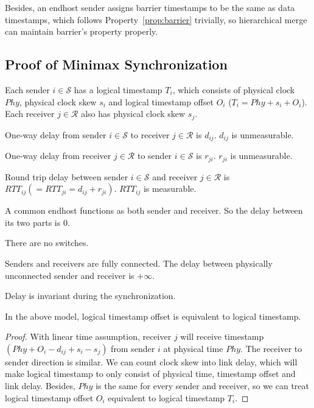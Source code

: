 Besides, an endhost sender assigns barrier timestamps to be the same as data timestamps, which follows Property~\ref{prop:barrier} trivially, so hierarchical merge can maintain barrier's property properly.
\subsection{Proof of Minimax Synchronization}
\label{appx:minimax}

\begin{notation}
	Each sender $i\in\mathcal{S}$ has a logical timestamp $T_i$, which consists of physical clock $Phy$, physical clock skew $s_i$ and logical timestamp offset $O_i$ ($T_i = Phy+s_i+O_i$). Each receiver $j \in \mathcal{R}$ also has physical clock skew $s_j$.
\end{notation}\begin{notation}
	One-way delay from sender $i \in \mathcal{S}$ to receiver $j \in \mathcal{R}$ is $d_{ij}$. $d_{ij}$ is unmeasurable.
\end{notation}
\begin{notation}
	One-way delay from receiver $j \in \mathcal{R}$ to sender $i \in \mathcal{S}$ is $r_{ji}$. $r_{ji}$ is unmeasurable.
\end{notation}
\begin{notation}
	Round trip delay between sender $i \in \mathcal{S}$ and receiver $j \in \mathcal{R}$ is $RTT_{ij}( = RTT_{ji} = d_{ij} + r_{ji})$. $RTT_{ij}$ is measurable.
\end{notation}
\begin{note}
	A common endhost functions as both sender and receiver. So the delay between its two parts is $0$.
\end{note}
\begin{assump}
	There are no switches.
\end{assump}
\begin{assump}
	Senders and receivers are fully connected. The delay between physically unconnected sender and receiver is $+\infty$.
\end{assump}
\begin{assump}
	Delay is invariant during the synchronization.
\end{assump}
\begin{lemma}\label{proof:ts2offset}
	In the above model, logical timestamp offset is equivalent to logical timestamp.
\end{lemma}
\begin{proof}
	With linear time assumption, receiver $j$ will receive timestamp $(Phy+O_i-d_{ij}+s_i-s_j)$ from sender $i$ at physical time $Phy$.
	The receiver to sender direction is similar.
	We can count clock skew into link delay, which will make logical timestamp to only consist of physical time, timestamp offset and link delay.
	Besides, $Phy$ is the same for every sender and receiver, so we can treat logical timestamp offset $O_i$ equivalent to logical timestamp $T_i$.
\end{proof}
